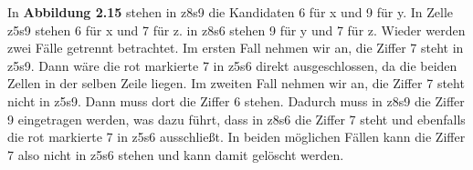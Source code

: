 In \textbf{Abbildung 2.15} stehen in z8s9 die Kandidaten 6 für x und 9 für y. In Zelle z5s9 stehen 6 für x und 7 für z. in z8s6 stehen 9 für y und 7 für z. Wieder werden zwei Fälle getrennt betrachtet. Im ersten Fall nehmen wir an, die Ziffer 7 steht in z5s9. Dann wäre die rot markierte 7 in z5s6 direkt ausgeschlossen, da die beiden Zellen in der selben Zeile liegen. Im zweiten Fall nehmen wir an, die Ziffer 7 steht nicht in z5s9. Dann muss dort die Ziffer 6 stehen. Dadurch muss in z8s9 die Ziffer 9 eingetragen werden, was dazu führt, dass in z8s6 die Ziffer 7 steht und ebenfalls die rot markierte 7 in z5s6 ausschließt. In beiden möglichen Fällen kann die Ziffer 7 also nicht in z5s6 stehen und kann damit gelöscht werden.